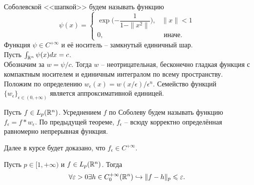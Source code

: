 \begin{example}
    Соболевской <<шапкой>> будем называть функцию
    \[
        \psi(x) = \begin{cases}
                      \exp\biggr({-\dfrac{1}{1 - \|x^2\|}}\biggr), & \|x\| < 1 \\
                      0, & \text{ иначе.}
        \end{cases}
    \]
    Функция $\psi \in C^{+\infty}$ и её носитель -- замкнутый единичный шар. \\
    Пусть $\int_{\mathbb{R}^n} \psi(x)dx = c$. \\
    Обозначим за $w = \psi/c$.
    Тогда $w$ -- неотрицательная, бесконечно гладкая функция с компактным носителем и единичным интегралом по всему пространству. \\
    Положим по определению $w_\epsilon(x) = w(x/\epsilon)/\epsilon^n$.
    Семейство функций $\{w_\epsilon\}_{\epsilon \in (0, +\infty)}$ является аппроксимативной единицей.
\end{example}
\begin{corollary}
    Пусть $f \in L_p(\mathbb{R}^n)$.
    Усреднением $f$ по Соболеву будем называть функцию $f_\epsilon = f * w_\epsilon$.
    По предыдущей теореме, $f_\epsilon$ -- всюду корректно определённая равномерно непрерывная функция.
\end{corollary}
\begin{note}
    Далее в курсе будет доказано, что $f_\epsilon \in C^{+\infty}$.
\end{note}
\begin{theorem}
    Пусть $p \in [1, +\infty)$ и $f \in L_p(\mathbb{R}^n)$. Тогда
    \[
        \forall \varepsilon > 0 \exists h \in C^{+\infty}_0(\mathbb{R}^n) \hookrightarrow \|f - h\|_p \leqslant \varepsilon.
    \]
\end{theorem}
